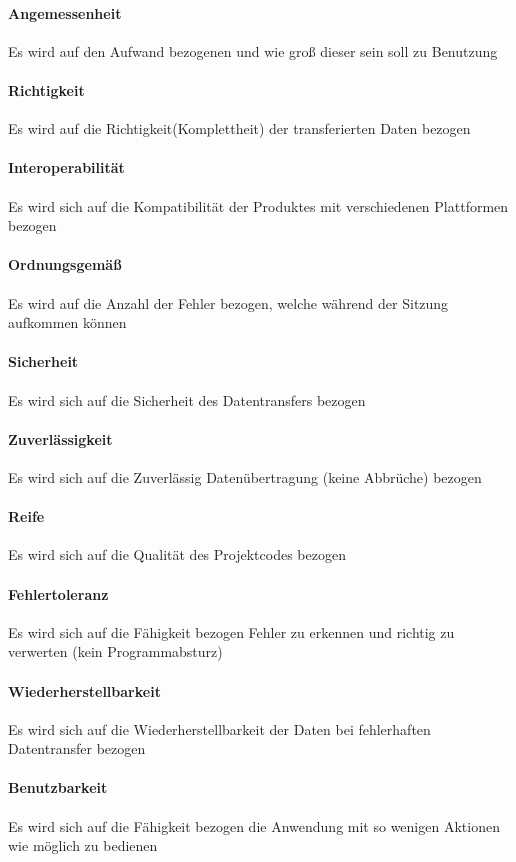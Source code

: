 \paragraph{Angemessenheit}Es wird auf den Aufwand bezogenen und wie groß dieser sein soll zu Benutzung
\paragraph{Richtigkeit}Es wird auf die Richtigkeit(Komplettheit) der transferierten Daten bezogen
\paragraph{Interoperabilität}Es wird sich auf die Kompatibilität der Produktes mit verschiedenen Plattformen bezogen
\paragraph{Ordnungsgemäß}Es wird auf die Anzahl der Fehler bezogen, welche während der Sitzung aufkommen können
\paragraph{Sicherheit}Es wird sich auf die Sicherheit des Datentransfers bezogen
\paragraph{Zuverlässigkeit}Es wird sich auf die Zuverlässig Datenübertragung (keine Abbrüche) bezogen
\paragraph{Reife}Es wird sich auf die Qualität des Projektcodes bezogen
\paragraph{Fehlertoleranz}Es wird sich auf die Fähigkeit bezogen Fehler zu erkennen und richtig zu verwerten (kein Programmabsturz)
\paragraph{Wiederherstellbarkeit}Es wird sich auf die Wiederherstellbarkeit der Daten bei fehlerhaften Datentransfer bezogen
\paragraph{Benutzbarkeit}Es wird sich auf die Fähigkeit bezogen die Anwendung mit so wenigen Aktionen wie möglich zu bedienen
